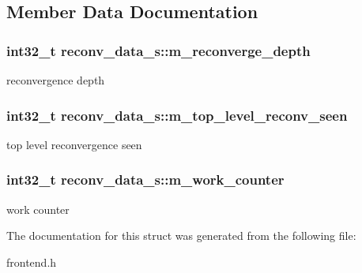 \subsection{Member Data Documentation}
\hypertarget{structreconv__data__s_a1b2d372adb1e9920c6a37fd3e1b72a77}{
\subsubsection[{m\_\-reconverge\_\-depth}]{\setlength{\rightskip}{0pt plus 5cm}int32\_\-t {\bf reconv\_\-data\_\-s::m\_\-reconverge\_\-depth}}}
\label{structreconv__data__s_a1b2d372adb1e9920c6a37fd3e1b72a77}
reconvergence depth \hypertarget{structreconv__data__s_a14a215431914767f23ecd5529a02ccac}{
\subsubsection[{m\_\-top\_\-level\_\-reconv\_\-seen}]{\setlength{\rightskip}{0pt plus 5cm}int32\_\-t {\bf reconv\_\-data\_\-s::m\_\-top\_\-level\_\-reconv\_\-seen}}}
\label{structreconv__data__s_a14a215431914767f23ecd5529a02ccac}
top level reconvergence seen \hypertarget{structreconv__data__s_ac79260e63c70c3ed072a91b31d0744d1}{
\subsubsection[{m\_\-work\_\-counter}]{\setlength{\rightskip}{0pt plus 5cm}int32\_\-t {\bf reconv\_\-data\_\-s::m\_\-work\_\-counter}}}
\label{structreconv__data__s_ac79260e63c70c3ed072a91b31d0744d1}
work counter 

The documentation for this struct was generated from the following file:\begin{DoxyCompactItemize}
\item 
frontend.h\end{DoxyCompactItemize}
